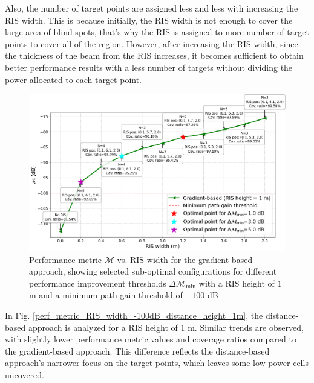 \documentclass{IEEEoj}
\begin{document}
Also, the number of target points are assigned less and less with increasing the RIS width. This is because initially, the RIS width is not enough to cover the large area of blind spots, that's why the RIS is assigned to more number of target points to cover all of the region. However, after increasing the RIS width, since the thickness of the beam from the RIS increases, it becomes sufficient to obtain better performance results with a less number of targets without dividing the power allocated to each target point.

\begin{figure}
	\centering
	\includegraphics[width=\linewidth]{Sim_Results/perf_metric_RIS_width_-100dB_gradient_height_1m.png}
	\caption{Performance metric $\mathcal{M}$ vs. RIS width for the gradient-based approach, showing selected sub-optimal configurations for different performance improvement thresholds $\Delta \mathcal{M}_{\text{min}}$ with a RIS height of $1$ m and a minimum path gain threshold of $-100$ dB}
	\label{perf_metric_RIS_width_-100dB_gradient_height_1m}
\end{figure}

In Fig. \ref{perf_metric_RIS_width_-100dB_distance_height_1m}, the distance-based approach is analyzed for a RIS height of $1$ m. Similar trends are observed, with slightly lower performance metric values and coverage ratios compared to the gradient-based approach. This difference reflects the distance-based approach’s narrower focus on the target points, which leaves some low-power cells uncovered.
\end{document}
